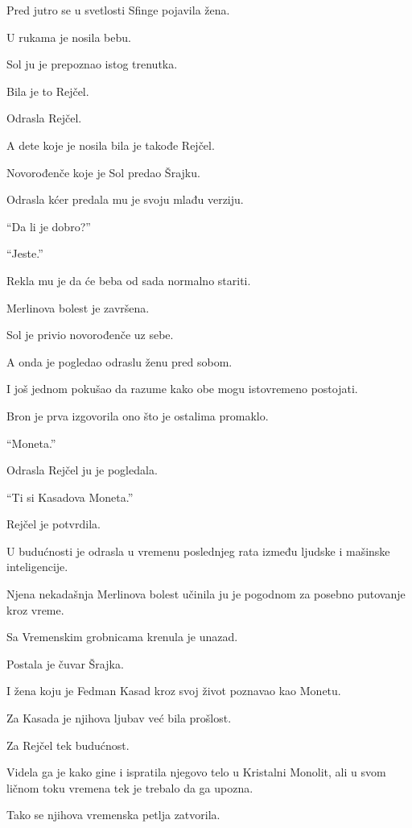 Pred jutro se u svetlosti Sfinge pojavila žena.

U rukama je nosila bebu.

Sol ju je prepoznao istog trenutka.

Bila je to Rejčel.

Odrasla Rejčel.

A dete koje je nosila bila je takođe Rejčel.

Novorođenče koje je Sol predao Šrajku.

\bigskip

Odrasla kćer predala mu je svoju mlađu verziju.

``Da li je dobro?''

``Jeste.''

Rekla mu je da će beba od sada normalno stariti.

Merlinova bolest je završena.

Sol je privio novorođenče uz sebe.

A onda je pogledao odraslu ženu pred sobom.

I još jednom pokušao da razume kako obe mogu istovremeno postojati.

\bigskip

Bron je prva izgovorila ono što je ostalima promaklo.

``Moneta.''

Odrasla Rejčel ju je pogledala.

``Ti si Kasadova Moneta.''

Rejčel je potvrdila.

\bigskip

U budućnosti je odrasla u vremenu poslednjeg rata između ljudske i mašinske inteligencije.

Njena nekadašnja Merlinova bolest učinila ju je pogodnom za posebno putovanje kroz vreme.

Sa Vremenskim grobnicama krenula je unazad.

Postala je čuvar Šrajka.

I žena koju je Fedman Kasad kroz svoj život poznavao kao Monetu.

\bigskip

Za Kasada je njihova ljubav već bila prošlost.

Za Rejčel tek budućnost.

Videla ga je kako gine i ispratila njegovo telo u Kristalni Monolit, ali u svom ličnom toku vremena tek je trebalo da ga upozna.

Tako se njihova vremenska petlja zatvorila.

